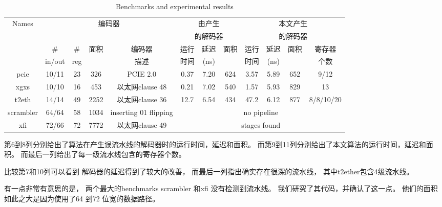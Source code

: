 \begin{table*}[t]
\caption{Benchmarks and experimental results}
\begin{tabular}{|c|c|c|c|c|c|c|c|c|c|c|c|}
\hline
 Names     & \multicolumn{4}{|c|}{编码器}                                  &   \multicolumn{3}{|c|}{由\cite{ShenTCAD11}产生}             &   \multicolumn{4}{|c|}{本文产生} \\
           & \multicolumn{4}{|c|}{}                                              &   \multicolumn{3}{|c|}{的解码器}  &   \multicolumn{4}{|c|}{的解码器} \\\cline{2-12}
           &    \#   &   \#    &面积& 编码器&运行&延迟&面积                                       &运行&延迟&面积&寄存器\\
           & in/out  &  reg    &      &   描述&时间&(ns) &                                        &时间 &(ns) &    &个数\\\hline\hline
 pcie      & 10/11   & 23      & 326  &PCIE 2.0 \cite{pcie21}                    &0.37 &7.20 &624                                     &3.57 & 5.89&652 &9/12\\\hline
 xgxs      & 10/10   & 16      & 453  &     以太网clause 48 \cite{IEEE8023_S4}&0.21 &7.02 &540                                     &1.57 & 5.93&829 &13\\\hline
 t2eth     & 14/14   & 49      & 2252 &    以太网clause 36 \cite{IEEE8023_S4} &12.7 &6.54 &434                                     &47.2 & 6.12&877 &8/8/10/20\\\hline
scrambler  &64/64    & 58      & 1034 & inserting 01 flipping                    &     \multicolumn{7}{|c|}{no pipeline }\\\cline{1-5}
 xfi       & 72/66   & 72      & 7772 &     以太网clause 49 \cite{IEEE8023_S4}&     \multicolumn{7}{|c|}{stages found}\\\hline
\end{tabular}\label{tab_bench_chap4}
\end{table*}





第6到8列分别给出了\cite{ShenTCAD11}算法在产生误流水线的解码器时的运行时间，延迟和面积。
而第9到11列分别给出了本文算法的运行时间，延迟和面积。
而最后一列给出了每一级流水线包含的寄存器个数。

比较第7和10列可以看到
解码器的延迟得到了较大的改善，
而最后一列指出确实存在很深的流水线，
其中t2ether包含4级流水线。

有一点非常有意思的是，
两个最大的benchmarks scrambler 和xfi 没有检测到流水线。
我们研究了其代码，并确认了这一点。
他们的面积如此之大是因为使用了64 到72 位宽的数据路径。

